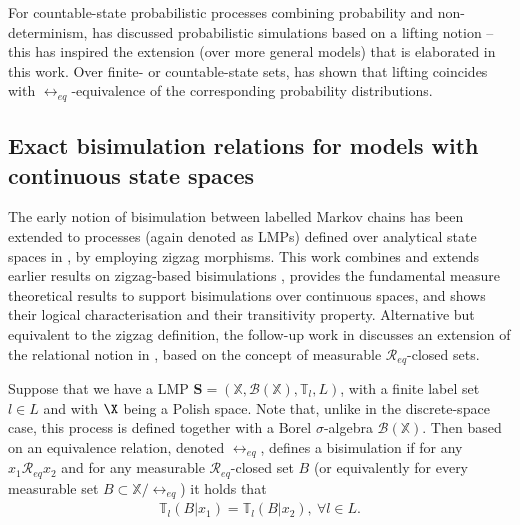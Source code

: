 \documentclass[letterpaper, 10 pt, conference]{amsart}
\theoremstyle{definition}
\theoremstyle{example}
\theoremstyle{remark}
\begin{document}
For countable-state probabilistic processes combining probability and non-determinism, 
\cite{Segala1995,Segala1995a} has discussed probabilistic simulations based on a lifting notion -- this has inspired the extension (over more general models) that is elaborated in this work. 
Over finite- or countable-state sets, 
\cite[Lemma 8.2.2]{Segala1995} has shown that lifting coincides with $\rel_{eq}$-equivalence of the corresponding probability distributions. 
 
\subsection{Exact bisimulation relations for models with continuous state spaces} The early notion of 
bisimulation between labelled Markov chains \cite{larsen1991bisimulation} has been extended to processes (again denoted as LMPs) defined over analytical state spaces in \cite{Desharnais2002}, by employing 
zigzag morphisms. 
This work combines and extends earlier results on zigzag-based bisimulations \cite{Blute1997,Desharnais1998,Edalat1999a},  
provides the fundamental measure theoretical results to support bisimulations over continuous spaces, 
and shows their logical characterisation and their transitivity property.  
Alternative but equivalent to the zigzag definition, 
the follow-up work in 
\cite{Desharnais2003} discusses an extension of the relational notion in \cite{larsen1991bisimulation}, 
based on the concept of measurable $\mathcal R_{eq}$-closed sets. 

Suppose that we have a LMP $\mathbf S=(\mathbb X,\mathcal B(\mathbb X ),\mathbb T_l,L)$, 
with a finite label set $l\in L$ and with $\X$ being a Polish space. 
Note that, unlike in the discrete-space case, this process is defined together with a Borel $\sigma$-algebra $\mathcal B(\mathbb X )$. 
 Then based on \cite{Desharnais2003} an equivalence relation, denoted $\rel_{eq}$, defines a bisimulation if for any $x_1 \mathcal R_{eq} x_2$ and for any measurable $\mathcal R_{eq}$-closed set $B$ (or equivalently for every measurable set $B\subset \mathbb X /\rel_{eq}$) it holds that
\begin{align*}\mathbb T_{l}(B|x_1)=\mathbb T_{l}(B|x_2),\  \forall l\in L.\end{align*}
\end{document}
